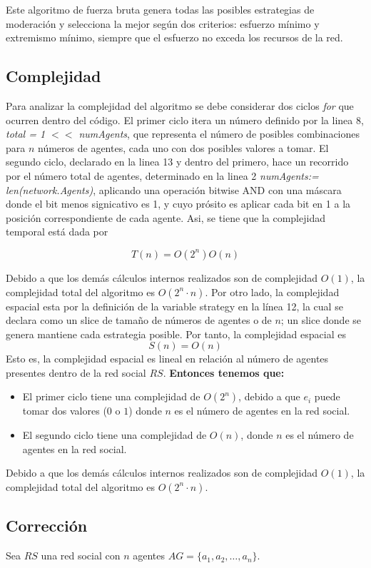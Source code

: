 \documentclass[letterpaper,10pt]{article}
\begin{document}
Este algoritmo de fuerza bruta genera todas las posibles estrategias de moderación y selecciona la mejor según dos criterios: esfuerzo mínimo y extremismo mínimo, siempre que el esfuerzo no exceda los recursos de la red.


\subsection{Complejidad}
\label{subsec:complejidad_fuerza_bruta}
Para analizar la complejidad del algoritmo se debe considerar dos ciclos \textit{for} que ocurren dentro del código. El primer ciclo itera un número definido por la linea 8, \textit{total = 1 $<<$ numAgents}, que representa el número de posibles combinaciones para $n$ números de agentes, cada uno con dos posibles valores a tomar. El segundo ciclo, declarado en la linea 13 y dentro del primero,  hace un recorrido por el número total de agentes, determinado en la linea 2 \textit{numAgents:= len(network.Agents)}, aplicando una operación bitwise AND con una máscara donde el bit menos signicativo es 1, y cuyo prósito es aplicar cada bit en 1 a la posición correspondiente de cada agente. Asi, se tiene que la complejidad temporal está dada por

\[
T(n) = O(2^n)O(n)
\]

Debido a que los demás cálculos internos realizados son de complejidad \(O(1)\), la complejidad total del algoritmo es \(O(2^n \cdot n)\).
Por otro lado, la complejidad espacial esta por la definición de la variable strategy en la línea 12, la cual se declara como un slice de tamaño de números de agentes o de $n$; un slice donde se genera mantiene cada estrategia posible. Por tanto, la complejidad espacial es
\[
S(n) = O(n)
\]
Esto es, la complejidad espacial es lineal en relación al número de agentes  presentes dentro de la red social $RS$.
\textbf{Entonces tenemos que:}
\begin{itemize}
  \item El primer ciclo tiene una complejidad de \(O(2^n)\), debido a que $e_i$ puede tomar dos valores ($0$ o $1$) donde \(n\) es el número de agentes en la red social.
  \item El segundo ciclo tiene una complejidad de \(O(n)\), donde \(n\) es el número de agentes en la red social.
\end{itemize}
Debido a que los demás cálculos internos realizados son de complejidad \(O(1)\), la complejidad total del algoritmo es \(O(2^n \cdot n)\).
\subsection{Corrección}
\label{subsec:correccion_fuerza_bruta}
Sea $RS$ una red social con $n$ agentes $AG = \{a_1, a_2, \dots, a_n\}$.
\end{document}
